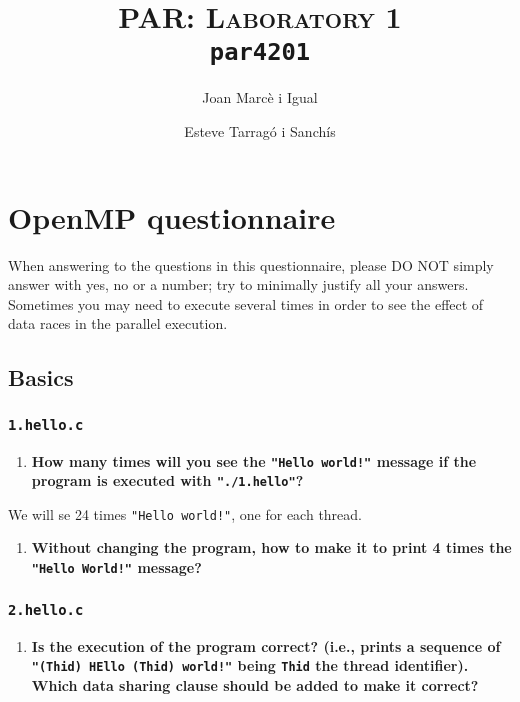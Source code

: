 \documentclass[a4paper]{article}
\title{
	\textsc{PAR: Laboratory 1} \\
	\texttt{\large par4201}
}
\author{Joan Marcè i Igual \and Esteve Tarragó i Sanchís}
\begin{document}
\maketitle
\tableofcontents

\section{OpenMP questionnaire}

When answering to the questions in this questionnaire, please DO NOT simply answer with yes, no or a number; try to minimally justify all your answers. Sometimes you may need to execute several times in order to see the effect of data races in the parallel execution.

\subsection{Basics}

\subsubsection{\texttt{1.hello.c}}

\begin{enumerate}
	\item \textbf{How many times will you see the \texttt{"Hello world!"} message if the program is executed with \texttt{"./1.hello"}?}
\end{enumerate}

We will se 24 times \texttt{"Hello world!"}, one for each thread.

\begin{enumerate}[resume]
	\item \textbf{Without changing the program, how to make it to print 4 times the \texttt{"Hello World!"} message?}
\end{enumerate}

\subsubsection{\texttt{2.hello.c}}

\begin{enumerate}
	\item \textbf{Is the execution of the program correct? (i.e., prints a sequence of \texttt{"(Thid) HEllo (Thid) world!"} being \texttt{Thid} the thread identifier). Which data sharing clause should be added to make it correct?}
\end{enumerate}
\end{document}
